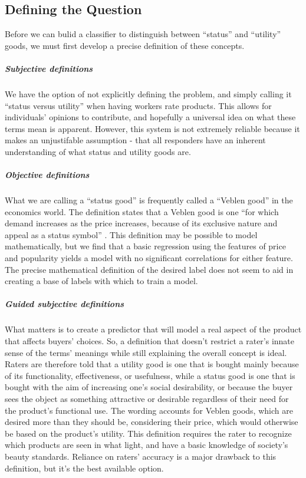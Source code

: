 \documentclass[dvips,12pt]{article}
\begin{document}
\subsection{Defining the Question}
Before we can bulid a classifier to distinguish between “status” and “utility” goods, we must first develop a precise definition of these concepts.
\subparagraph{Subjective definitions}
We have the option of not explicitly defining the problem, and simply calling it “status versus utility” when having workers rate products. This allows for individuals’ opinions to contribute, and hopefully a universal idea on what these terms mean is apparent. However, this system is not extremely reliable because it makes an unjustifable assumption - that all responders have an inherent understanding of what status and utility goods are. 
\subparagraph{Objective definitions}
What we are calling a “status good” is frequently called a “Veblen good” in the economics world. The definition states that a Veblen good is one “for which demand increases as the price increases, because of its exclusive nature and appeal as a status symbol” \cite{veblen}. This definition may be possible to model mathematically, but we find that a basic regression using the features of price and popularity yields a model with no significant correlations for either feature. The precise mathematical definition of the desired label does not seem to aid in creating a base of labels with which to train a model.
\subparagraph{Guided subjective definitions}
What matters is to create a predictor that will model a real aspect of the product that affects buyers’ choices. So, a definition that doesn’t restrict a rater’s innate sense of the terms’ meanings while still explaining the overall concept is ideal. Raters are therefore told that a utility good is one that is bought mainly because of its functionality, effectiveness, or usefulness, while a status good is one that is bought with the aim of increasing one’s social desirability, or because the buyer sees the object as something attractive or desirable regardless of their need for the product’s functional use. The wording accounts for Veblen goods, which are desired more than they should be, considering their price, which would otherwise be based on the product’s utility. This definition requires the rater to recognize which products are seen in what light, and have a basic knowledge of society’s beauty standards. Reliance on raters’ accuracy is a major drawback to this definition, but it’s the best available option.
\end{document}
